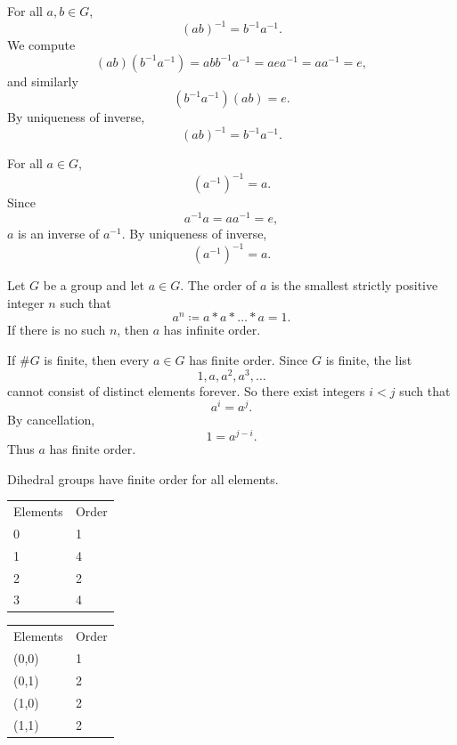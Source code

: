 \begin{proposition}{
    For all $a,b\in G$,
    \[
        (ab)^{-1}=b^{-1}a^{-1}.
    \]
}
    We compute
    \[
        (ab)(b^{-1}a^{-1})=abb^{-1}a^{-1}=aea^{-1}=aa^{-1}=e,
    \]
    and similarly
    \[
        (b^{-1}a^{-1})(ab)=e.
    \]
    By uniqueness of inverse,
    \[
        (ab)^{-1}=b^{-1}a^{-1}.
    \]
\end{proposition}

\begin{proposition}{
    For all $a\in G$,
    \[
        (a^{-1})^{-1}=a.
    \]
}
    Since
    \[
        a^{-1}a=aa^{-1}=e,
    \]
    $a$ is an inverse of $a^{-1}$.
    By uniqueness of inverse,
    \[
        (a^{-1})^{-1}=a.
    \]
\end{proposition}

\begin{definition}[Order]
    Let $G$ be a group and let $a\in G$.
    The order of $a$ is the smallest strictly positive integer $n$ such that
    \[
        a^n \coloneqq a*a*\dots*a = 1.
    \]
    If there is no such $n$, then $a$ has infinite order.
\end{definition}

\begin{theorem}{
    If $\#G$ is finite, then every $a\in G$ has finite order.
}
    Since $G$ is finite, the list
    \[
        1,a,a^2,a^3,\dots
    \]
    cannot consist of distinct elements forever.
    So there exist integers $i<j$ such that
    \[
        a^i=a^j.
    \]
    By cancellation,
    \[
        1=a^{j-i}.
    \]
    Thus $a$ has finite order.
\end{theorem}

\begin{example}
    Dihedral groups have finite order for all elements.
\end{example}

\begin{example}[$G_1=(\mathbb{Z}_4,+)$]
    \begin{tabular}{ll}
        Elements & Order \\
        0 & 1 \\
        1 & 4 \\
        2 & 2 \\
        3 & 4
    \end{tabular}
\end{example}

\begin{example}[$G_2=\mathbb{Z}_2\times\mathbb{Z}_2$]
    \begin{tabular}{ll}
        Elements & Order \\
        (0,0) & 1 \\
        (0,1) & 2 \\
        (1,0) & 2 \\
        (1,1) & 2
    \end{tabular}
\end{example}

